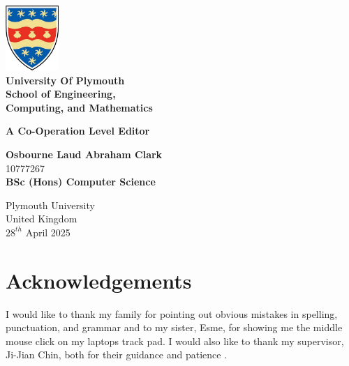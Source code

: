 \begin{titlepage}
  \begin{center}
    \includegraphics[width=0.15\textwidth]{./plymouthUniLogo2}\\
    \large
    \textbf{University Of Plymouth}\\
    \vspace{0.15cm}
    \large
    \textbf{School of Engineering,\\ Computing, and Mathematics}
    
    \vspace{1.9cm}
    \Huge
    \textbf{A Co-Operation Level Editor}
    
    \vspace{4.5cm}
    \Large
    \textbf{Osbourne Laud Abraham Clark}\\
    10777267\\
    \large
   \textbf{ BSc (Hons) Computer Science}
    
    \vspace{1.5cm}
      

    \large
    Plymouth University\\
    United Kingdom\\
    $28^{th}$ April 2025
    
    
    
  \end{center}
\end{titlepage}

\section*{Acknowledgements}
I would like to thank my family for pointing out obvious mistakes in spelling, punctuation, and grammar and to my sister, Esme, for showing me the middle mouse click on my laptops track pad. I would also like to thank my supervisor, Ji-Jian Chin, both for their guidance and patience .

